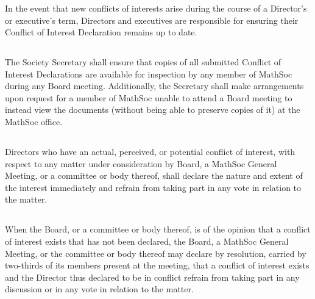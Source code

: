 \subsubsection{}
In the event that new conflicts of interests arise during the course of a Director’s or executive’s term, Directors and executives are responsible for ensuring their Conflict of Interest Declaration remains up to date.

\subsection{}
The Society Secretary shall ensure that copies of all submitted Conflict of Interest Declarations are available for inspection by any member of MathSoc during any Board meeting. Additionally, the Secretary shall make arrangements upon request for a member of MathSoc unable to attend a Board meeting to instead view the documents (without being able to preserve copies of it) at the MathSoc office.

\subsection{}
Directors who have an actual, perceived, or potential conflict of interest, with respect to any matter under consideration by Board, a MathSoc General Meeting, or a committee or body thereof, shall declare the nature and extent of the interest immediately and refrain from taking part in any vote in relation to the matter.

\subsection{} 
When the Board, or a committee or body thereof, is of the opinion that a conflict of interest exists that has not been declared, the Board, a MathSoc General Meeting, or the committee or body thereof may declare by resolution, carried by two-thirds of its members present at the meeting, that a conflict of interest exists and the Director thus declared to be in conflict refrain from taking part in any discussion or in any vote in relation to the matter.
